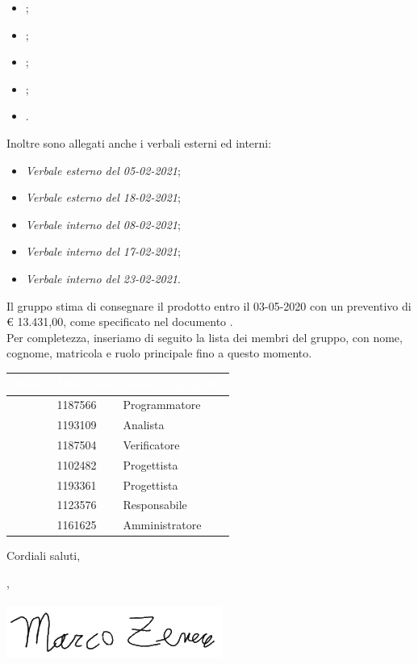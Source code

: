 \documentclass[11pt]{letter}
\begin{document}
\begin{letter}
\begin{itemize}
        	\item {};
            \item {};
            \item {};
            \item {};
            \item {}.
        \end{itemize}
        Inoltre sono allegati anche i verbali esterni ed interni:
        \begin{itemize}
            \item \textit{Verbale esterno del 05-02-2021};
            \item \textit{Verbale esterno del 18-02-2021};
            \item \textit{Verbale interno del 08-02-2021};
            \item \textit{Verbale interno del 17-02-2021};
            \item \textit{Verbale interno del 23-02-2021}.
        \end{itemize}
        Il gruppo stima di consegnare il prodotto entro il 03-05-2020 con un preventivo di \euro{} 13.431,00, come specificato nel documento .\\
        Per completezza, inseriamo di seguito la lista dei membri del gruppo, con nome, cognome, matricola e ruolo principale fino a questo momento.
        {
            \renewcommand{\arraystretch}{2}
            \begin{longtable}{ C{4cm} C{4cm} C{4cm}}
                \textcolor{white}{\textbf{Nome}} & \textcolor{white}{\textbf{Matricola}} & \textcolor{white}{\textbf{Ruolo di progetto}}\\
                \endhead 
                \SG{} & 1187566 & Programmatore\\
                \BM{} & 1193109 & Analista\\
                \RA{} & 1187504 & Verificatore\\
                \SH{} & 1102482 & Progettista\\
                \PA{} & 1193361 & Progettista \\
                \ZM{} & 1123576 & Responsabile\\
                \SP{} & 1161625 & Amministratore \\
            \end{longtable}
        }
        Cordiali saluti,
        \begin{flushright}
        	\closing{\ZM{}, \\ \textit{\Responsabile{}} \\\includegraphics[width=.6\linewidth]{Utility/Images/firmaZM.png}} 
        \end{flushright}
    \end{letter}
\end{document}
